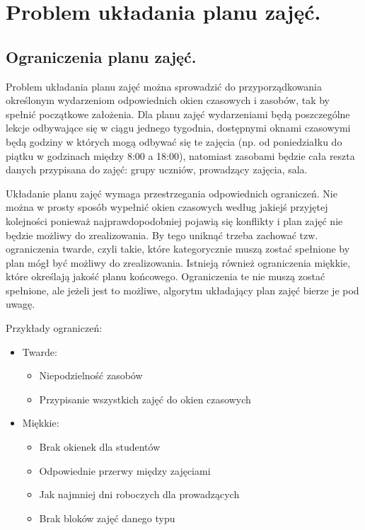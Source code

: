 \chapter{Problem układania planu zajęć.}
\section{Ograniczenia planu zajęć.}
Problem układania planu zajęć można sprowadzić do przyporządkowania określonym wydarzeniom odpowiednich okien czasowych i zasobów, tak by spełnić początkowe założenia. Dla planu zajęć wydarzeniami będą poszczególne lekcje odbywające się w ciągu jednego tygodnia, dostępnymi oknami czasowymi będą godziny w których mogą odbywać się te zajęcia (np. od poniedziałku do piątku w godzinach między 8:00 a 18:00), natomiast zasobami będzie cała reszta danych przypisana do zajęć: grupy uczniów, prowadzący zajęcia, sala.

Układanie planu zajęć wymaga przestrzegania odpowiednich ograniczeń. Nie można w prosty sposób wypełnić okien czasowych według jakiejś przyjętej kolejności ponieważ najprawdopodobniej pojawią się konflikty i plan zajęć nie będzie możliwy do zrealizowania. By tego uniknąć trzeba zachować tzw. ograniczenia twarde, czyli takie, które kategorycznie muszą zostać spełnione by plan mógł być możliwy do zrealizowania. Istnieją również ograniczenia miękkie, które określają jakość planu końcowego. Ograniczenia te nie muszą zostać spełnione, ale jeżeli jest to możliwe, algorytm układający plan zajęć bierze je pod uwagę.

Przykłady ograniczeń:
\begin{itemize}
	\item Twarde:
	\begin{itemize}
		\item Niepodzielność zasobów
		\item Przypisanie wszystkich zajęć do okien czasowych
	\end{itemize}
	\item Miękkie:
	\begin{itemize}
		\item Brak okienek dla studentów
		\item Odpowiednie przerwy między zajęciami
		\item Jak najmniej dni roboczych dla prowadzących
		\item Brak bloków zajęć danego typu
	\end{itemize}
\end{itemize}


